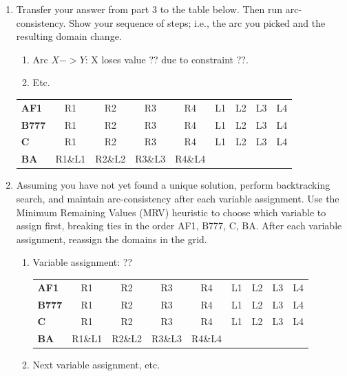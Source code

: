 \documentclass[11pt]{article}
\begin{document}
\begin{enumerate}
\item Transfer your answer from part 3 to the table below. Then run
  arc-consistency.  Show your sequence of steps; i.e., the arc you
  picked and the resulting domain change.

  \begin{enumerate}

  \item Arc $X->Y$:  X loses value ?? due to constraint ??.

  \item Etc.
 
  \end{enumerate}

\begin{center}\begin{tabular}{l|cccccccc|}
{\bf AF1}  & R1 & R2 & R3 & R4 & L1 & L2 & L3 & L4 \\ 
{\bf B777} & R1 & R2 & R3 & R4 & L1 & L2 & L3 & L4 \\ 
{\bf C}    & R1 & R2 & R3 & R4 & L1 & L2 & L3 & L4 \\ 
{\bf BA}   & R1\&L1 & R2\&L2 & R3\&L3 & R4\&L4 &  &  &  &  \\ 
\end{tabular}\end{center}

\item Assuming you have not yet found a unique solution, perform
  backtracking search, and maintain arc-consistency after each
  variable assignment. Use the Minimum Remaining Values (MRV)
  heuristic to choose which variable to assign first, breaking ties in
  the order AF1, B777, C, BA.  After each variable assignment,
  reassign the domains in the grid.

  \begin{enumerate}

  \item Variable assignment:  ??

\begin{center}\begin{tabular}{l|cccccccc|}
{\bf AF1}  & R1 & R2 & R3 & R4 & L1 & L2 & L3 & L4 \\ 
{\bf B777} & R1 & R2 & R3 & R4 & L1 & L2 & L3 & L4 \\ 
{\bf C}    & R1 & R2 & R3 & R4 & L1 & L2 & L3 & L4 \\ 
{\bf BA}   & R1\&L1 & R2\&L2 & R3\&L3 & R4\&L4 &  &  &  &  \\ 
\end{tabular}\end{center}

   \item Next variable assignment, etc.

   \end{enumerate}

\end{enumerate}
\end{document}
